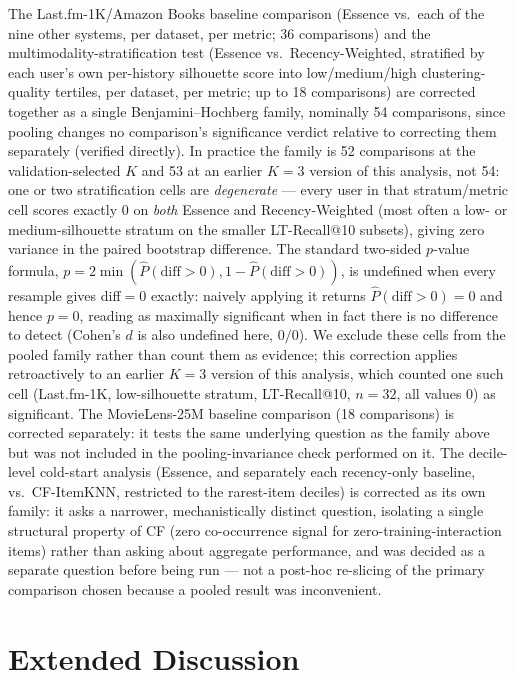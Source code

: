 \documentclass{article}
\begin{document}
The Last.fm-1K/Amazon Books baseline comparison (Essence vs.\ each of the nine other systems, per dataset, per metric; 36 comparisons) and the multimodality-stratification test (Essence vs.\ Recency-Weighted, stratified by each user's own per-history silhouette score into low/medium/high clustering-quality tertiles, per dataset, per metric; up to 18 comparisons) are corrected together as a single Benjamini--Hochberg family, nominally 54 comparisons, since pooling changes no comparison's significance verdict relative to correcting them separately (verified directly). In practice the family is 52 comparisons at the validation-selected $K$ and 53 at an earlier $K=3$ version of this analysis, not 54: one or two stratification cells are \emph{degenerate} --- every user in that stratum/metric cell scores exactly $0$ on \emph{both} Essence and Recency-Weighted (most often a low- or medium-silhouette stratum on the smaller LT-Recall@10 subsets), giving zero variance in the paired bootstrap difference. The standard two-sided $p$-value formula, $p = 2\min(\hat{P}(\text{diff}{>}0), 1-\hat{P}(\text{diff}{>}0))$, is undefined when every resample gives diff${}={}0$ exactly: naively applying it returns $\hat{P}(\text{diff}{>}0)=0$ and hence $p=0$, reading as maximally significant when in fact there is no difference to detect (Cohen's $d$ is also undefined here, $0/0$). We exclude these cells from the pooled family rather than count them as evidence; this correction applies retroactively to an earlier $K=3$ version of this analysis, which counted one such cell (Last.fm-1K, low-silhouette stratum, LT-Recall@10, $n=32$, all values $0$) as significant. The MovieLens-25M baseline comparison (18 comparisons) is corrected separately: it tests the same underlying question as the family above but was not included in the pooling-invariance check performed on it. The decile-level cold-start analysis (Essence, and separately each recency-only baseline, vs.\ CF-ItemKNN, restricted to the rarest-item deciles) is corrected as its own family: it asks a narrower, mechanistically distinct question, isolating a single structural property of CF (zero co-occurrence signal for zero-training-interaction items) rather than asking about aggregate performance, and was decided as a separate question before being run --- not a post-hoc re-slicing of the primary comparison chosen because a pooled result was inconvenient.

\section{Extended Discussion}
\label{app:discussion}
\end{document}
